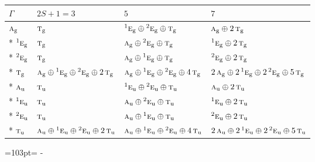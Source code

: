 \documentclass[10pt,a4paper]{article}
\newcommand{\needspace}[1]{\par\penalty-100\begingroup\dimen0=#1\relax\dimen2=\pagegoal
  \advance\dimen2-\pagetotal\ifdim\dimen0>\dimen2\relax\ifdim\dimen2>0pt\vfil\break\fi\fi
  \endgroup}
\numberwithin{equation}{section}
\newcommand{\irr}[1]{\text{\normalfont\scshape #1}}
\newcommand{\conjpair}[1]{{}^{#1}}
\newcommand{\ptag}[1]{\mathrm{#1}}
\begin{document}
{\small\setlength{\tabcolsep}{3pt}\begin{longtable}{@{}llll@{}}\toprule
$\Gamma$ & $2S + 1 = 3$ & $5$ & $7$\\\midrule\endhead
\bottomrule\endfoot\endlastfoot
$\irr{a}_{\ptag{g}}$ & $\irr{t}_{\ptag{g}}$ & $\conjpair{1}\irr{e}_{\ptag{g}}\oplus \conjpair{2}\irr{e}_{\ptag{g}}\oplus \irr{t}_{\ptag{g}}$ & $\irr{a}_{\ptag{g}}\oplus 2\,\irr{t}_{\ptag{g}}$\\*
$\conjpair{1}\irr{e}_{\ptag{g}}$ & $\irr{t}_{\ptag{g}}$ & $\irr{a}_{\ptag{g}}\oplus \conjpair{2}\irr{e}_{\ptag{g}}\oplus \irr{t}_{\ptag{g}}$ & $\conjpair{1}\irr{e}_{\ptag{g}}\oplus 2\,\irr{t}_{\ptag{g}}$\\*
$\conjpair{2}\irr{e}_{\ptag{g}}$ & $\irr{t}_{\ptag{g}}$ & $\irr{a}_{\ptag{g}}\oplus \conjpair{1}\irr{e}_{\ptag{g}}\oplus \irr{t}_{\ptag{g}}$ & $\conjpair{2}\irr{e}_{\ptag{g}}\oplus 2\,\irr{t}_{\ptag{g}}$\\*
$\irr{t}_{\ptag{g}}$ & $\irr{a}_{\ptag{g}}\oplus \conjpair{1}\irr{e}_{\ptag{g}}\oplus \conjpair{2}\irr{e}_{\ptag{g}}\oplus 2\,\irr{t}_{\ptag{g}}$ & $\irr{a}_{\ptag{g}}\oplus \conjpair{1}\irr{e}_{\ptag{g}}\oplus \conjpair{2}\irr{e}_{\ptag{g}}\oplus 4\,\irr{t}_{\ptag{g}}$ & $2\,\irr{a}_{\ptag{g}}\oplus 2\,\conjpair{1}\irr{e}_{\ptag{g}}\oplus 2\,\conjpair{2}\irr{e}_{\ptag{g}}\oplus 5\,\irr{t}_{\ptag{g}}$\\*
$\irr{a}_{\ptag{u}}$ & $\irr{t}_{\ptag{u}}$ & $\conjpair{1}\irr{e}_{\ptag{u}}\oplus \conjpair{2}\irr{e}_{\ptag{u}}\oplus \irr{t}_{\ptag{u}}$ & $\irr{a}_{\ptag{u}}\oplus 2\,\irr{t}_{\ptag{u}}$\\*
$\conjpair{1}\irr{e}_{\ptag{u}}$ & $\irr{t}_{\ptag{u}}$ & $\irr{a}_{\ptag{u}}\oplus \conjpair{2}\irr{e}_{\ptag{u}}\oplus \irr{t}_{\ptag{u}}$ & $\conjpair{1}\irr{e}_{\ptag{u}}\oplus 2\,\irr{t}_{\ptag{u}}$\\*
$\conjpair{2}\irr{e}_{\ptag{u}}$ & $\irr{t}_{\ptag{u}}$ & $\irr{a}_{\ptag{u}}\oplus \conjpair{1}\irr{e}_{\ptag{u}}\oplus \irr{t}_{\ptag{u}}$ & $\conjpair{2}\irr{e}_{\ptag{u}}\oplus 2\,\irr{t}_{\ptag{u}}$\\*
$\irr{t}_{\ptag{u}}$ & $\irr{a}_{\ptag{u}}\oplus \conjpair{1}\irr{e}_{\ptag{u}}\oplus \conjpair{2}\irr{e}_{\ptag{u}}\oplus 2\,\irr{t}_{\ptag{u}}$ & $\irr{a}_{\ptag{u}}\oplus \conjpair{1}\irr{e}_{\ptag{u}}\oplus \conjpair{2}\irr{e}_{\ptag{u}}\oplus 4\,\irr{t}_{\ptag{u}}$ & $2\,\irr{a}_{\ptag{u}}\oplus 2\,\conjpair{1}\irr{e}_{\ptag{u}}\oplus 2\,\conjpair{2}\irr{e}_{\ptag{u}}\oplus 5\,\irr{t}_{\ptag{u}}$\\
\bottomrule\end{longtable}}
\needspace{103pt}
\end{document}
